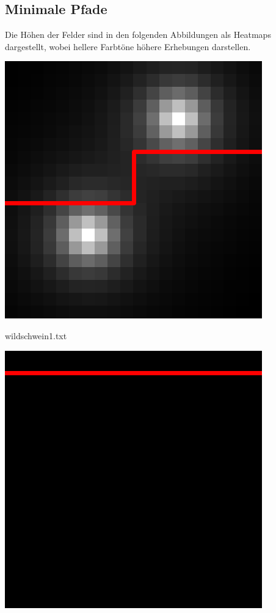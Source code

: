 \documentclass[a4paper, 12pt]{scrartcl}
\begin{document}
\subsection*{Minimale Pfade}
\label{app:paths}
Die Höhen der Felder sind in den folgenden Abbildungen als Heatmaps dargestellt, wobei hellere Farbtöne höhere Erhebungen darstellen.
\begin{center}
	\begin{minipage}[t]{.3\textwidth}
		\centering
		\includegraphics[width=\textwidth]{img/resized1}\par
		\ttfamily wildschwein1.txt
	\end{minipage}\hfill
	\begin{minipage}[t]{.3\textwidth}
		\centering
		\includegraphics[width=\textwidth]{img/resized2}\par

\end{minipage}
\end{center}
\end{document}
